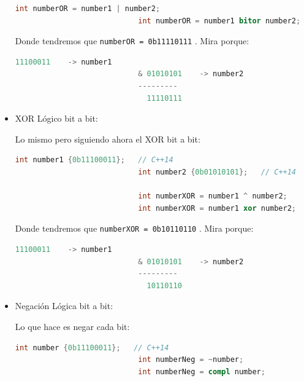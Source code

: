 \documentclass[12pt, fleqn]{report}                             %
\theoremstyle{break}                                            %
\newcommand{\textCode}[1]  { \texttt{#1} }                      %
\begin{document}
\begin{itemize}
\begin{lstlisting}[language=C++, gobble=28]
                            int numberOR = number1 | number2;
                            int numberOR = number1 bitor number2;
                        \end{lstlisting}

                        Donde tendremos que \textCode{numberOR = 0b11110111}. Mira porque:
                        \begin{lstlisting}[language=C++, gobble=28]
                              11100011    -> number1
                            & 01010101    -> number2
                            ---------
                              11110111
                        \end{lstlisting}
                    
                    \item XOR Lógico bit a bit: 
                    
                        Lo mismo pero siguiendo ahora el XOR bit a bit:
                        \begin{lstlisting}[language=C++, gobble=28]
                            int number1 {0b11100011};   // C++14
                            int number2 {0b01010101};   // C++14

                            int numberXOR = number1 ^ number2;
                            int numberXOR = number1 xor number2;
                        \end{lstlisting}

                        Donde tendremos que \textCode{numberXOR = 0b10110110}. Mira porque:
                        \begin{lstlisting}[language=C++, gobble=28]
                              11100011    -> number1
                            & 01010101    -> number2
                            ---------
                              10110110
                        \end{lstlisting}

                    \item Negación Lógica bit a bit: 
                    
                        Lo que hace es negar cada bit:
                        \begin{lstlisting}[language=C++, gobble=28]
                            int number {0b11100011};   // C++14
                            int numberNeg = ~number;
                            int numberNeg = compl number;
                        \end{lstlisting}


\end{itemize}
\end{document}
